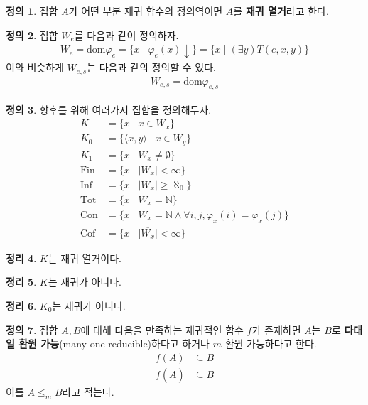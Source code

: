 \documentclass[b5paper, 11pt]{book}
\theoremstyle{definition}
\newtheorem{defn}{정의}[chapter]
\newtheorem{thm}[defn]{정리}
\begin{document}
\begin{defn}
    집합 $A$가 어떤 부분 재귀 함수의 정의역이면 $A$를 \textbf{재귀 열거}라고 한다.
\end{defn}
\begin{defn}    
    집합 $W_e$를 다음과 같이 정의하자.
    \begin{align*}
        W_e = \text{dom} \varphi_e = \{x \;\vert\; \varphi_e (x) \downarrow\} = \{x \;\vert\; (\exists y) T(e,x,y)\}
    \end{align*}
    이와 비슷하게 $W_{e,s}$는 다음과 같의 정의할 수 있다.
    \begin{align*}
        W_{e,s} = \text{dom}\varphi_{e,s}
    \end{align*}
\end{defn}
\begin{defn}\label{index set example}
    향후를 위해 여러가지 집합을 정의해두자.
    \begin{align*}
        K &= \{ x \;\vert\; x \in W_x \} \\ 
        K_0 &= \{ \langle x, y \rangle \;\vert\; x \in W_y \} \\       K_1 &= \{ x \;\vert\; W_x \neq \emptyset \} \\ 
        \mathrm{Fin} &= \{ x \;\vert\; \vert W_x \vert < \infty \} \\ 
        \mathrm{Inf} &= \{ x \;\vert\; \vert W_x \vert \ge \aleph_0 \} \\ 
        \mathrm{Tot} &= \{ x \;\vert\; W_x = \mathbb{N} \} \\ 
        \mathrm{Con} &= \{ x \;\vert\; W_x = \mathbb{N} \wedge \forall i, j, \varphi_x (i) = \varphi_ x (j) \} \\
        \mathrm{Cof} &= \{x \;\vert\; \vert \overline{W_x}\vert < \infty \}
    \end{align*}
\end{defn}
\begin{thm}
    $K$는 재귀 열거이다.
\end{thm}
\begin{thm}
    $K$는 재귀가 아니다.
\end{thm}
\begin{thm}
    $K_0$는 재귀가 아니다.
\end{thm}
\begin{defn}
    집합 $A, B$에 대해 다음을 만족하는 재귀적인 함수 $f$가 존재하면 $A$는 $B$로 \textbf{다대일 환원 가능}(many-one reducible)하다고 하거나 $m$-환원 가능하다고 한다.
    \begin{align*}
        f(A) &\subseteq B \\ 
        f(\overline{A}) &\subseteq \overline{B}
    \end{align*}
    이를 $A \le_m B$라고 적는다.
\end{defn}
\end{document}
